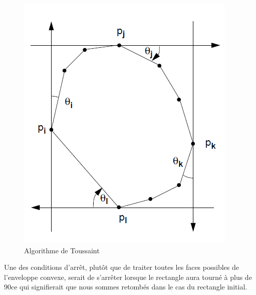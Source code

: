 \newpage
\begin{figure}[ht]
\begin{center}
\includegraphics[scale=0.5]{images/toussaint.png}
\caption{Algorithme de Toussaint}
\end{center}
\end{figure}

Une des conditions d'arrêt, plutôt que de traiter toutes les faces possibles de l'enveloppe convexe, serait de s'arrêter lorsque le rectangle aura tourné à plus de $90$\degre ce qui signifierait que nous sommes retombés dans le cas du rectangle initial.

